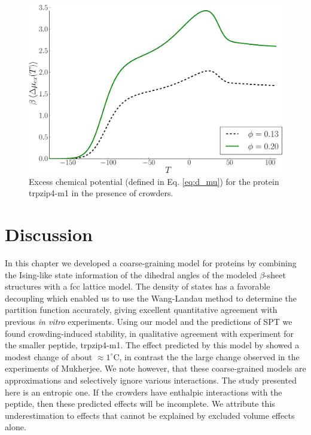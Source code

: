 \begin{figure}[ht]
\includegraphics[width=\figurewidthSINGLE]{WL_crowding_paper/PLOT_trpzip_change_chem_pot-crop.pdf}
\caption{Excess chemical potential (defined in Eq. \ref{eq:d_mu}) for the protein trpzip4-m1 in the presence of crowders.}
\label{fig:trpzip_chem_change_plot}
\end{figure}



\section{Discussion \label{sec:conclusion}}
In this chapter we developed a coarse-graining model for proteins by combining the Ising-like state information of the dihedral angles of the modeled $\beta$-sheet structures with a fcc lattice model. The density of states has a favorable decoupling which enabled us to use the Wang-Landau method to determine the partition function accurately, giving excellent quantitative agreement with previous \textit{in vitro} experiments. Using our model and the predictions of SPT we found crowding-induced stability, in qualitative agreement with experiment for the smaller peptide, trpzip4-m1. The effect predicted by this model by showed a modest change of about $\approx 1^\circ$C, in contrast the the large change observed in the experiments of Mukherjee.\cite{mukherjee_effect_2009} We note however, that these coarse-grained models are approximations and selectively ignore various interactions. The study presented here is an entropic one. If the crowders have enthalpic interactions with the peptide, then these predicted effects will be incomplete. We attribute this underestimation to effects that cannot be explained by excluded volume effects alone.

